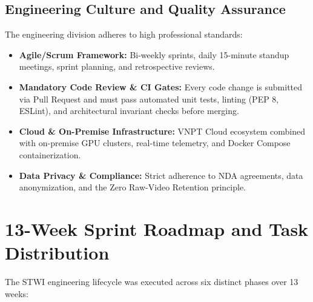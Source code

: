 \subsection{Engineering Culture and Quality Assurance}
The engineering division adheres to high professional standards:
\begin{itemize}[leftmargin=1.5cm, label=$\bullet$]
  \item \textbf{Agile/Scrum Framework:} Bi-weekly sprints, daily 15-minute standup meetings, sprint planning, and retrospective reviews.
  \item \textbf{Mandatory Code Review \& CI Gates:} Every code change is submitted via Pull Request and must pass automated unit tests, linting (PEP 8, ESLint), and architectural invariant checks before merging.
  \item \textbf{Cloud \& On-Premise Infrastructure:} VNPT Cloud ecosystem combined with on-premise GPU clusters, real-time telemetry, and Docker Compose containerization.
  \item \textbf{Data Privacy \& Compliance:} Strict adherence to NDA agreements, data anonymization, and the Zero Raw-Video Retention principle.
\end{itemize}

\section{13-Week Sprint Roadmap and Task Distribution}
The STWI engineering lifecycle was executed across six distinct phases over 13 weeks:

